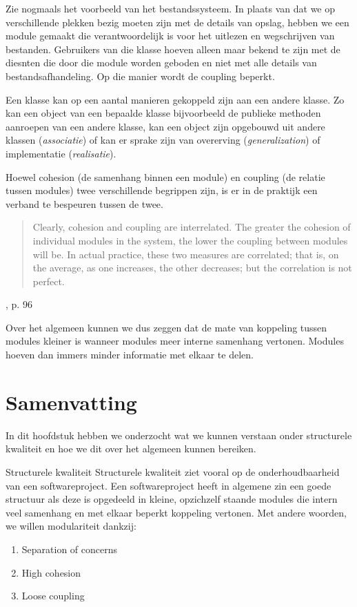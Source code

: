 Zie nogmaals het voorbeeld van het bestandssysteem. In plaats van dat we op 
verschillende plekken bezig moeten zijn met de details van opslag, hebben we 
een module gemaakt die verantwoordelijk is voor het uitlezen en wegschrijven 
van bestanden. Gebruikers van die klasse hoeven alleen maar bekend te zijn met de 
diesnten die door die module worden geboden en niet met alle details van bestandsafhandeling.
Op die manier wordt de coupling beperkt.

Een klasse kan op een aantal manieren gekoppeld zijn aan een andere
klasse. Zo kan een object van een bepaalde klasse bijvoorbeeld de publieke methoden
aanroepen van een andere klasse, kan een object zijn opgebouwd uit andere
klassen (\emph{associatie}) of kan er sprake zijn van
overerving (\emph{generalization}) of implementatie (\emph{realisatie}).

Hoewel cohesion (de samenhang binnen een module) 
en coupling (de relatie tussen modules) 
twee verschillende begrippen zijn, is er in de praktijk 
een verband te bespeuren tussen de twee.
\blockquote{
Clearly, cohesion and coupling are interrelated. The greater
the cohesion of individual modules in the system, the lower
the coupling between modules will be. In actual practice,
these two measures are correlated; that is, on the average,
as one increases, the other decreases; but the correlation is 
not perfect.
}{\cite{YourdonConstantine1979}, p. 96}

Over het algemeen kunnen we dus zeggen dat de mate van koppeling
tussen modules kleiner is wanneer modules meer interne samenhang vertonen.
Modules hoeven dan immers minder informatie met elkaar te delen.

\section{Samenvatting}
In dit hoofdstuk hebben we onderzocht wat we kunnen verstaan onder
structurele kwaliteit en hoe we dit over het algemeen kunnen bereiken.

\begin{defbox}{Structurele kwaliteit}
    Structurele kwaliteit ziet vooral op de onderhoudbaarheid
    van een softwareproject.
    \newline\newline
    Een softwareproject heeft in algemene zin 
    een goede structuur als deze is opgedeeld in kleine,
    opzichzelf staande modules die intern veel samenhang 
    en met elkaar beperkt koppeling vertonen.
    \newline\newline
    Met andere woorden, we willen modulariteit dankzij:
    \begin{enumerate}
        \item Separation of concerns
        \item High cohesion
        \item Loose coupling
    \end{enumerate}
\end{defbox}


